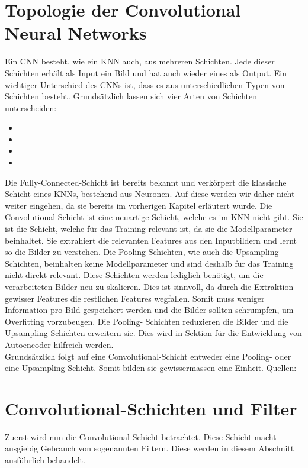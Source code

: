 \section{Topologie der Convolutional Neural Networks}
Ein CNN besteht, wie ein KNN auch, aus mehreren Schichten. Jede dieser Schichten erhält
als Input ein Bild und hat auch wieder eines als Output.
Ein wichtiger Unterschied des CNNs ist, dass es aus unterschiedlichen Typen von
Schichten besteht. Grundsätzlich lassen sich vier Arten von Schichten unterscheiden:
\begin{itemize}
\item{}
\item{}
\item{}
\item{}
\end{itemize}
Die Fully-Connected-Schicht ist bereits bekannt und verkörpert die klassische Schicht
eines KNNs, bestehend aus Neuronen. Auf diese werden wir daher nicht weiter eingehen,
da sie bereits im vorherigen Kapitel erläutert wurde.
\para{}
Die Convolutional-Schicht ist eine neuartige Schicht, welche es im KNN nicht
gibt. Sie ist die Schicht, welche für das Training relevant ist,
da sie die Modellparameter beinhaltet. Sie extrahiert die relevanten Features
aus den Inputbildern und lernt so die Bilder zu verstehen.
\para{}
Die Pooling-Schichten, wie auch die Upsampling-Schichten, beinhalten keine
Modellparameter und sind deshalb für das Training nicht direkt relevant.
Diese Schichten werden lediglich benötigt, um die verarbeiteten Bilder neu zu
skalieren. Dies ist sinnvoll, da durch die Extraktion gewisser Features die
restlichen Features wegfallen. Somit muss weniger Information pro Bild gespeichert
werden und die Bilder sollten schrumpfen, um Overfitting vorzubeugen. Die Pooling-
Schichten reduzieren die Bilder und die Upsampling-Schichten erweitern sie.
Dies wird in Sektion  für die Entwicklung von Autoencoder
hilfreich werden. \\
Grundsätzlich folgt auf eine Convolutional-Schicht entweder eine Pooling-
oder eine Upsampling-Schicht. Somit bilden sie gewissermassen eine Einheit.
\para{}
Quellen: \cite{Goodfellow-et-al-2016} \cite{deeplearning.ai:cnn} \cite{wiki:cnn}


\section{Convolutional-Schichten und Filter}
Zuerst wird nun die Convolutional Schicht betrachtet. Diese Schicht macht ausgiebig
Gebrauch von sogenannten Filtern. Diese werden in diesem Abschnitt ausführlich behandelt.

